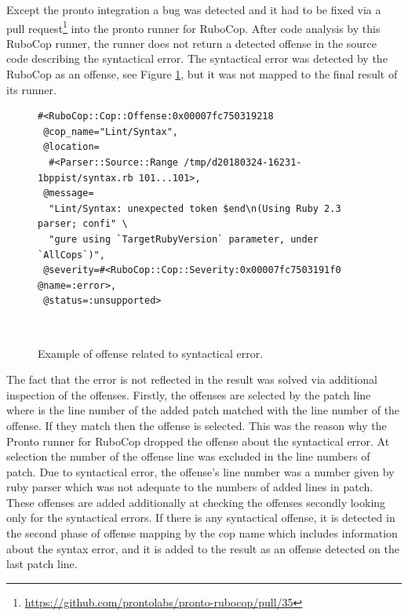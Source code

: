 Except the pronto integration a bug was detected and it had to be fixed via a pull request\footnote{\url{https://github.com/prontolabs/pronto-rubocop/pull/35}} into the pronto runner for RuboCop. After code analysis by this RuboCop runner, the runner does not return a detected offense in the source code describing the syntactical error. The syntactical error was detected by the RuboCop as an offense, see Figure \ref{fig:syntax_offense}, but it was not mapped to the final result of its runner.

\begin{figure}[H]
\begin{lstlisting}[basicstyle=\scriptsize, xleftmargin=.14\textwidth]
#<RuboCop::Cop::Offense:0x00007fc750319218
 @cop_name="Lint/Syntax",
 @location=
  #<Parser::Source::Range /tmp/d20180324-16231-1bppist/syntax.rb 101...101>,
 @message=
  "Lint/Syntax: unexpected token $end\n(Using Ruby 2.3 parser; confi" \
  "gure using `TargetRubyVersion` parameter, under `AllCops`)",
 @severity=#<RuboCop::Cop::Severity:0x00007fc7503191f0 @name=:error>,
 @status=:unsupported>
\end{lstlisting}  
\hfill\\[-3em]
\caption{Example of offense related to syntactical error.}
\label{fig:syntax_offense}
\end{figure}

The fact that the error is not reflected in the result was solved via additional inspection of the offenses. Firstly, the offenses are selected by the patch line where is the line number of the added patch matched with the line number of the offense. If they match then the offense is selected. This was the reason why the Pronto runner for RuboCop dropped the offense about the syntactical error. At selection the number of the offense line was excluded in the line numbers of patch. Due to syntactical error, the offense's line number was a number given by ruby parser which was not adequate to the numbers of added lines in patch. These offenses are added additionally at checking the offenses secondly looking only for the syntactical errors. If there is any syntactical offense, it is detected in the second phase of offense mapping by the cop name which includes information about the syntax error, and it is added to the result as an offense detected on the last patch line.

